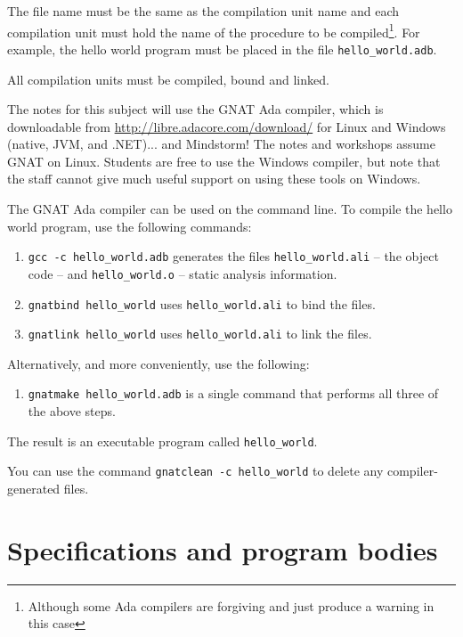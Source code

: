 The file name must be the same as the compilation unit name and each compilation unit must hold the name of the procedure to be compiled\footnote{Although some Ada compilers are forgiving and just produce a warning in this case}. For example, the hello world program must be placed in the file \texttt{hello\_world.adb}.

All compilation units must be compiled, bound and linked.


The notes for this subject will use the GNAT Ada compiler, which is downloadable from \url{http://libre.adacore.com/download/} for Linux and Windows (native, JVM, and .NET)... and Mindstorm!  The notes and workshops assume GNAT on Linux. Students are free to use the Windows compiler, but note that the staff cannot give much useful support on using these tools on Windows.

The GNAT Ada compiler can be used on the command line. To compile the hello world program, use the following commands:

  \begin{enumerate}
  \item \texttt{gcc -c hello\_world.adb} generates the files \texttt{hello\_world.ali} -- the
    object code -- and \texttt{hello\_world.o} -- static analysis
    information.

  \item \texttt{gnatbind hello\_world} uses \texttt{hello\_world.ali} to bind the files.

  \item \texttt{gnatlink hello\_world} uses \texttt{hello\_world.ali} to link the files.

  \end{enumerate}

Alternatively, and more conveniently, use the following:

   \begin{enumerate}
  \item \texttt{gnatmake hello\_world.adb} is a single command that performs all
    three of the above steps.
  \end{enumerate}


The result is an executable program called \texttt{hello\_world}.

You can use the command \texttt{gnatclean -c hello\_world} to delete any compiler-generated files.


\section{Specifications and program bodies}

